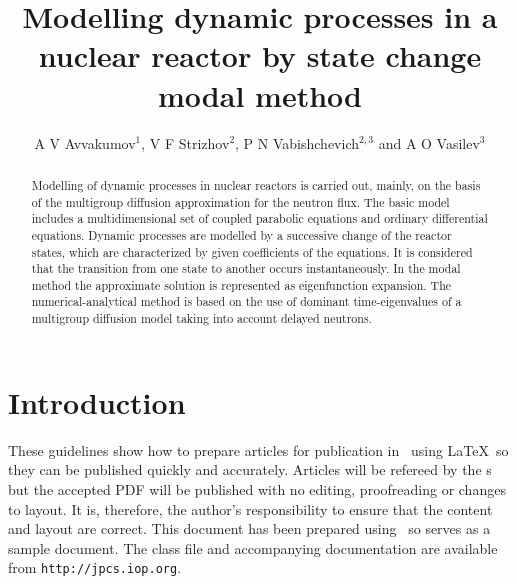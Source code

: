 \documentclass[a4paper]{jpconf}
\begin{document}
\title{Modelling dynamic processes in a nuclear reactor by state change modal method}

\author{A V Avvakumov$^1$, V F Strizhov$^2$, P N Vabishchevich$^{2,3}$ and A O Vasilev$^3$}

\address{$^1$ National Research Center Kurchatov Institute, Moscow, Russia}
\address{$^2$ Nuclear Safety Institute of RAS, Moscow, Russia}
\address{$^3$ North-Eastern Federal University, Yakutsk, Russia}


\begin{abstract}
Modelling of dynamic processes in nuclear reactors is carried out, mainly, on
the basis of the multigroup diffusion approximation for the neutron flux. 
The basic model includes a multidimensional set of coupled parabolic equations and
ordinary differential equations.
Dynamic processes are modelled by a successive
change of the reactor states, which are characterized by given coefficients of the equations. 
It is considered that the transition from one state to another occurs instantaneously.
In the modal method the approximate solution is represented as eigenfunction expansion. 
The numerical-analytical method is based on the use of dominant time-eigenvalues of
a multigroup diffusion model taking into account delayed neutrons. 
\end{abstract}

\section{Introduction}
These guidelines show how to prepare articles for publication in \jpcs\ using \LaTeX\ so they can be published quickly and accurately. Articles will be refereed by the \corg s but the accepted PDF will be published with no editing, proofreading or changes to layout. It is, therefore, the author's responsibility to ensure that the content and layout are correct.  This document has been prepared using \cls\ so serves as a sample document. The class file and accompanying documentation are available from \verb"http://jpcs.iop.org".
\end{document}
